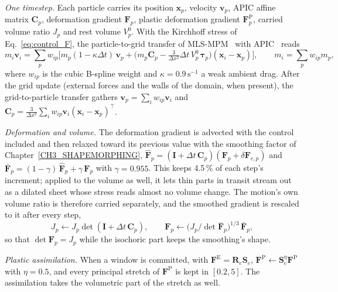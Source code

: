 \textit{One timestep.} Each particle carries its position $\mathbf{x}_p$, velocity $\mathbf{v}_p$, APIC affine matrix
$\mathbf{C}_p$, deformation gradient $\mathbf{F}_p$, plastic deformation gradient $\mathbf{F}^{\mathrm{P}}_p$, carried volume
ratio $J_p$ and rest volume $V^0_p$. With the Kirchhoff stress of Eq.~\eqref{eq:control_F}, the particle-to-grid transfer
of MLS-MPM~\citep{hu2018mlsmpm} with APIC~\citep{jiang2016material} reads
\begin{equation}
\label{ch4:eq_p2g}
m_i\mathbf{v}_i=\sum_p w_{ip}\Big[m_p(1-\kappa\Delta t)\,\mathbf{v}_p
  +\Big(m_p\mathbf{C}_p-\tfrac{3}{\Delta x^{2}}\Delta t\,V^0_p\,\boldsymbol{\tau}_p\Big)(\mathbf{x}_i-\mathbf{x}_p)\Big],
\qquad m_i=\sum_p w_{ip}m_p ,
\end{equation}
where $w_{ip}$ is the cubic B-spline weight and $\kappa=0.9\,\mathrm{s}^{-1}$ a weak ambient drag. After the grid update
(external forces and the walls of the domain, when present), the grid-to-particle transfer gathers
$\mathbf{v}_p=\sum_i w_{ip}\mathbf{v}_i$ and $\mathbf{C}_p=\tfrac{3}{\Delta x^2}\sum_i w_{ip}\mathbf{v}_i(\mathbf{x}_i-\mathbf{x}_p)^{\top}$.

\textit{Deformation and volume.} The deformation gradient is advected with the control included and then relaxed toward
its previous value with the smoothing factor of Chapter~\ref{CH3_SHAPEMORPHING},
$\hat{\mathbf{F}}_p=(\mathbf{I}+\Delta t\,\mathbf{C}_p)(\mathbf{F}_p+\delta\mathbf{F}_{c,p})$ and
$\bar{\mathbf{F}}_p=(1-\gamma)\,\hat{\mathbf{F}}_p+\gamma\,\mathbf{F}_p$ with $\gamma=0.955$. This keeps 4.5\,\% of each step's
increment; applied to the volume as well, it lets thin parts in transit stream out as a dilated sheet whose stress reads
almost no volume change. The motion's own volume ratio is therefore carried separately, and the smoothed gradient is
rescaled to it after every step,
\begin{equation}
\label{ch4:eq_volume}
J_p\leftarrow J_p\det(\mathbf{I}+\Delta t\,\mathbf{C}_p),\qquad
\mathbf{F}_p\leftarrow\big(J_p/\det\bar{\mathbf{F}}_p\big)^{1/3}\,\bar{\mathbf{F}}_p ,
\end{equation}
so that $\det\mathbf{F}_p=J_p$ while the isochoric part keeps the smoothing's shape.

\textit{Plastic assimilation.} When a window is committed, with $\mathbf{F}^{\mathrm{E}}=\mathbf{R}_e\mathbf{S}_e$,
$\mathbf{F}^{\mathrm{P}}\leftarrow\mathbf{S}_e^{\eta}\mathbf{F}^{\mathrm{P}}$ with $\eta=0.5$, and every principal stretch of
$\mathbf{F}^{\mathrm{P}}$ is kept in $[0.2,5]$. The assimilation takes the volumetric part of the stretch as well.


